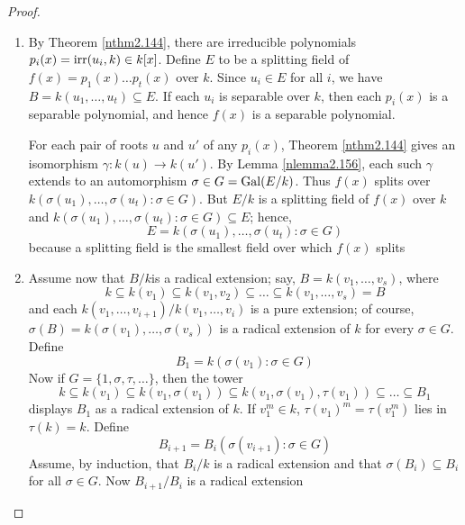 \documentclass[11pt]{article}
\begin{document}
\begin{proof}
\begin{enumerate}
\item By Theorem \ref{nthm2.144}, there are irreducible polynomials 
\(p_i(x)=\operatorname{irr}(u_i,k)\in k[x]\). Define \(E\) to be a splitting field of 
\(f(x)=p_1(x)\dots p_t(x)\) over \(k\). Since \(u_i\in E\) for all \(i\), we
have \(B=k(u_1,\dots,u_t)\subseteq E\). If each \(u_i\) is separable over
\(k\), then each \(p_i(x)\) is a separable polynomial, and hence \(f(x)\)
is a separable polynomial.

For each pair of roots \(u\) and \(u'\) of any \(p_i(x)\), Theorem
\ref{nthm2.144} gives an isomorphism \(\gamma:k(u)\to k(u')\). By Lemma
\ref{nlemma2.156}, each such \(\gamma\) extends to an automorphism
\(\sigma\in G=\operatorname{Gal}(E/k)\). Thus \(f(x)\) splits over 
\(k(\sigma(u_1),\dots,\sigma(u_t):\sigma\in G)\). But \(E/k\) is a splitting field
of \(f(x)\) over \(k\) and \(k(\sigma(u_1),\dots,\sigma(u_t):\sigma\in G)\subseteq E\); hence,
\begin{equation*}
E=k(\sigma(u_1),\dots,\sigma(u_t):\sigma\in G)
\end{equation*}
because a splitting field is the smallest field over which \(f(x)\) splits

\item Assume now that \(B/k\)is a radical extension; say,
\(B=k(v_1,\dots,v_s)\), where 
\begin{equation*}
k\subseteq k(v_1)\subseteq k(v_1,v_2)\subseteq\dots\subseteq k(v_1,\dots,v_s)=B
\end{equation*}
and each \(k(v_1,\dots,v_{i+1})/k(v_1,\dots,v_i)\) is a pure extension;
of course, \(\sigma(B)=k(\sigma(v_1),\dots,\sigma(v_s))\) is a radical extension of \(k\)
for every \(\sigma\in G\). Define 
\begin{equation*}
B_1=k(\sigma(v_1):\sigma\in G)
\end{equation*}
Now if \(G=\{1,\sigma,\tau,\dots\}\), then the tower
\begin{equation*}
k\subseteq k(v_1)\subseteq k(v_1,\sigma(v_1))\subseteq
k(v_1,\sigma(v_1),\tau(v_1))\subseteq\dots\subseteq B_1
\end{equation*}
displays \(B_1\) as a radical extension of \(k\). If \(v_1^m\in k\), 
\(\tau(v_1)^m=\tau(v_1^m)\) lies in \(\tau(k)=k\). Define
\begin{equation*}
B_{i+1}=B_i(\sigma(v_{i+1}):\sigma\in G)
\end{equation*}
Assume, by induction, that \(B_i/k\) is a radical extension and that 
\(\sigma(B_i)\subseteq B_i\) for all \(\sigma\in G\). Now \(B_{i+1}/B_i\) is a
radical extension
\end{enumerate}
\end{proof}
\end{document}
